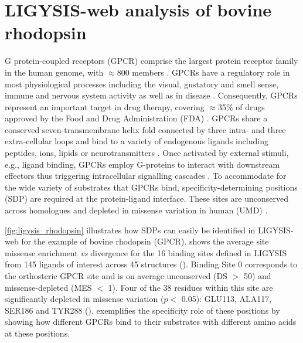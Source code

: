 \section{LIGYSIS-web analysis of bovine rhodopsin}

G protein-coupled receptors (GPCR) comprise the largest protein receptor family in the human genome, with $\approx$800 members \cite{LIU_2024_GPCRs}. GPCRs have a regulatory role in most physiological processes including the visual, gustatory and smell sense, immune and nervous system activity as well as in disease \cite{LATORRACA_2017_GPCRs}. Consequently, GPCRs represent  an important target in drug therapy, covering $\approx$35\% of drugs approved by the Food and Drug Administration (FDA) \cite{HAUSER_2017_GPCRS, INSEL_2019_GPCRs}. GPCRs share a conserved seven-transmembrane helix fold connected by three intra- and three extra-cellular loops \cite{ZHANG_2024_GPCRs} and bind to a variety of endogenous ligands including peptides, ions, lipids or neurotransmitters \cite{ZARZYCKA_2019_GPCRs, MANNES_2022_GPCRs}. Once activated by external stimuli, e.g., ligand binding, GPCRs employ G-proteins to interact with downstream effectors thus triggering intracellular signalling cascades \cite{CHENG_2023_GPCRs}. To accommodate for the wide variety of substrates that GPCRs bind, specificity-determining positions (SDP) are required at the protein-ligand interface. These sites are unconserved across homologues and depleted in missense variation in human (UMD) \cite{MACGOWAN_2024_VARIANTS}.

\autoref{fig:ligysis_rhodopsin} illustrates how SDPs can easily be identified in LIGYSIS-web for the example of bovine rhodopsin (GPCR).  shows the average site missense enrichment \textit{vs} divergence for the 16 binding sites defined in LIGYSIS from 145 ligands of interest across 45 structures (). Binding Site 0 corresponds to the orthosteric GPCR site and is on average unconserved (DS $>$ 50) and missense-depleted (MES $<$ 1). Four of the 38 residues within this site are significantly depleted in missense variation ($p <$ 0.05): GLU113, ALA117, SER186 and TYR288 ().  exemplifies the specificity role of these positions by showing how different GPCRs bind to their substrates with different amino acids at these positions.

